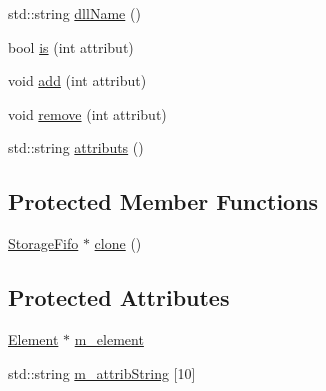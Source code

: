 \begin{DoxyCompactItemize}
\item 
std\+::string \hyperlink{classObject_a2e3947f2870094c332d7454117f3ec63}{dll\+Name} ()
\item 
bool \hyperlink{classAttrib_a704f26af560909ad22065083bb7d4c34}{is} (int attribut)
\item 
void \hyperlink{classAttrib_a235f773af19c900264a190b00a3b4ad7}{add} (int attribut)
\item 
void \hyperlink{classAttrib_a7d4ef7e32d93cb287792b87b857e79f3}{remove} (int attribut)
\item 
std\+::string \hyperlink{classAttrib_aee7bbf16b144887f196e1341b24f8a26}{attributs} ()
\end{DoxyCompactItemize}
\subsection*{Protected Member Functions}
\begin{DoxyCompactItemize}
\item 
\hyperlink{classStorageFifo_1_1StorageFifo}{Storage\+Fifo} $\ast$ \hyperlink{classStorageFifo_a80b534eb6d81a3b570f6957d6a932987}{clone} ()
\end{DoxyCompactItemize}
\subsection*{Protected Attributes}
\begin{DoxyCompactItemize}
\item 
\hyperlink{classElement}{Element} $\ast$ \hyperlink{classProcessus_aa9d24d53c3e52f36786cabb5d8e296e7}{m\+\_\+element}
\item 
std\+::string \hyperlink{classAttrib_a3414521d7a82476e874b25a5407b5e63}{m\+\_\+attrib\+String} \mbox{[}10\mbox{]}
\end{DoxyCompactItemize}
